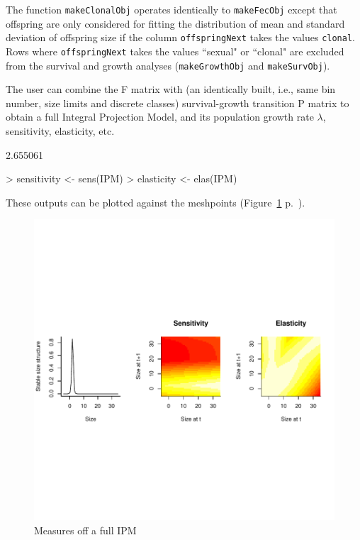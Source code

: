 \documentclass{article}
\begin{document}
The function {\tt makeClonalObj} operates identically to {\tt makeFecObj} except that offspring are only considered for fitting the distribution of mean and standard deviation of offspring size if the column {\tt offspringNext} takes the values {\tt clonal}. Rows where {\tt offspringNext} takes the values ``sexual" or ``clonal" are excluded from the survival and growth analyses ({\tt makeGrowthObj} and {\tt makeSurvObj}).

The user can combine the F matrix with (an identically built, i.e., same bin number, size limits and discrete classes) survival-growth transition P matrix to obtain a full Integral Projection Model, and its population growth rate $\lambda$, sensitivity, elasticity, etc. 
\begin{Schunk}
\begin{Soutput}
[1] 2.655061
\end{Soutput}
\begin{Sinput}
> sensitivity <- sens(IPM)
> elasticity <- elas(IPM)
\end{Sinput}
\end{Schunk}
These outputs can be plotted against the meshpoints (Figure~\ref{fig:four} p.~\pageref{fig:four}).
\begin{figure}
\begin{center}
\includegraphics{IPMpack_Vignette-fig4}
\end{center}
\caption{Measures off a full IPM}
\label{fig:four}
\end{figure}
\end{document}
